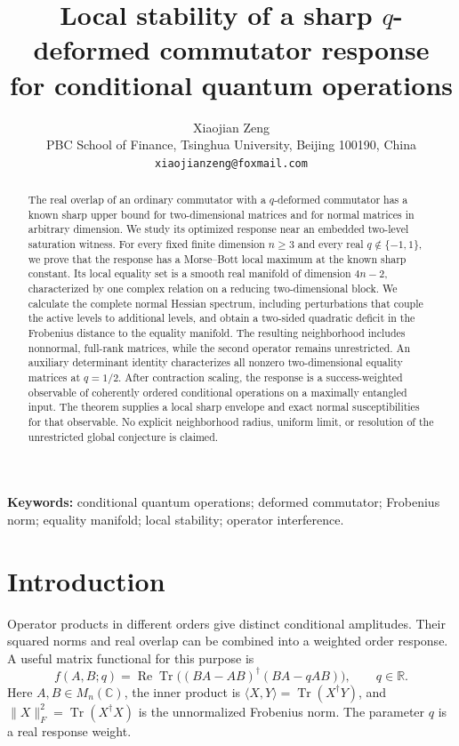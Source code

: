 \documentclass[11pt,a4paper]{article}
\title{Local stability of a sharp \(q\)-deformed commutator response\\
for conditional quantum operations}
\author{Xiaojian Zeng\\
\small PBC School of Finance, Tsinghua University, Beijing 100190, China\\
\small \texttt{xiaojianzeng@foxmail.com}}
\date{}
\newcommand{\Tr}{\operatorname{Tr}}
\newcommand{\norm}[1]{\lVert #1\rVert_F}
\newcommand{\ip}[2]{\langle #1,#2\rangle}
\begin{document}
\maketitle
\begin{abstract}
The real overlap of an ordinary commutator with a \(q\)-deformed
commutator has a known sharp upper bound for two-dimensional matrices
and for normal matrices in arbitrary dimension. We study its optimized
response near an embedded two-level saturation witness. For every fixed
finite dimension \(n\geq3\) and every real \(q\notin\{-1,1\}\), we prove
that the response has a Morse--Bott local maximum at the known sharp
constant. Its local equality set is a smooth real manifold of dimension
\(4n-2\), characterized by one complex relation on a reducing
two-dimensional block. We calculate the complete normal Hessian spectrum,
including perturbations that couple the active levels to additional levels,
and obtain a two-sided quadratic deficit in the Frobenius distance to
the equality manifold. The resulting neighborhood includes nonnormal,
full-rank matrices, while the second operator remains unrestricted.
An auxiliary determinant identity characterizes all nonzero
two-dimensional equality matrices at \(q=1/2\).
After contraction scaling, the response is a success-weighted observable
of coherently ordered conditional operations on a maximally entangled
input. The theorem supplies a local sharp envelope and exact normal
susceptibilities for that observable. No explicit neighborhood radius,
uniform limit, or resolution of the unrestricted global conjecture is
claimed.
\end{abstract}
\noindent\textbf{Keywords:} conditional quantum operations;
deformed commutator; Frobenius norm; equality manifold;
local stability; operator interference.

\section{Introduction}
Operator products in different orders give distinct conditional
amplitudes. Their squared norms and real overlap can be combined into
a weighted order response. A useful matrix functional for this purpose is
\begin{equation}
 f(A,B;q)=\operatorname{Re}\Tr\bigl((BA-AB)^\dagger(BA-qAB)\bigr),
 \qquad q\in\mathbb R.
 \label{eq:f}
\end{equation}
Here \(A,B\in M_n(\mathbb C)\), the inner product is
\(\ip{X}{Y}=\Tr(X^\dagger Y)\), and
\(\norm{X}^2=\Tr(X^\dagger X)\) is the unnormalized Frobenius norm.
The parameter \(q\) is a real response weight.
\end{document}
